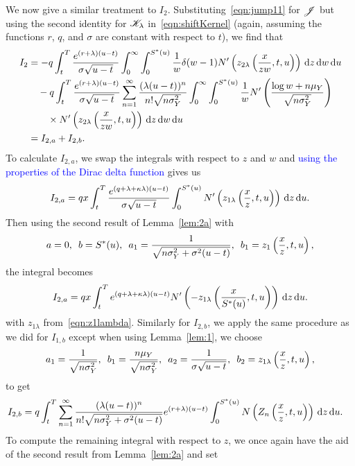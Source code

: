 		We now give a similar treatment to $I_2$. Substituting~\eqref{eqn:jump11} for $\mathscr J$ but using the second identity for $\mathscr K_\lambda$ in~\eqref{eqn:shiftKernel} (again, assuming the functions $r$, $q$, and $\sigma$ are constant with respect to $t$), we find that
		\begin{align*}
        			I_2 &= -q\int_t^T \frac{e^{(r+\lambda)(u-t)}}{\sigma\sqrt{u-t}} \int_0^\infty\int_0^{S^*(u)} \frac{1}{w} \delta(w-1) N'\left( z_{2\lambda}\left( \frac{x}{zw}, t, u \right) \right) \, \mathrm d z \, \mathrm d w \, \mathrm d u \\
        			& {}\quad -q\int_t^T \frac{e^{(r+\lambda)(u-t)}}{\sigma\sqrt{u-t}} \displaystyle\sum\limits_{n=1}^{\infty} \frac{(\lambda(u-t))^n}{n!\sqrt{n\sigma_Y^2}}\int_0^\infty \int_0^{S^*(u)} \frac{1}{w}N'\left( \frac{\log w + n\mu_Y}{\sqrt{n\sigma_Y^2}} \right) \\
        			& {} \quad \quad \times N'\left( z_{2\lambda}\left( \frac{x}{zw}, t, u \right) \right) \, \mathrm d z \, \mathrm d w \, \mathrm d u \\
        			&= I_{2,a} + I_{2,b}.
        		\end{align*}
		To calculate $I_{2,a}$, we swap the integrals with respect to $z$ and $w$ and \textcolor{blue}{using the properties of the Dirac delta function} gives us
			$$
				I_{2,a} = qx\int_t^T \frac{e^{(q+\lambda+\kappa\lambda)(u-t)}}{\sigma\sqrt{u-t}}\int_0^{S^*(u)} N'\left( z_{1\lambda}\left( \frac{x}{z}, t, u \right) \right) \, \mathrm d z \, \mathrm d u.
			$$
		Then using the second result of Lemma~\ref{lem:2a} with
			$$
				a = 0, \enskip b = S^*(u), \enskip a_1 = \frac{1}{\sqrt{n\sigma_Y^2 + \sigma^2(u-t)}}, \enskip
			b_1 = z_1\left( \frac{x}{z}, t, u \right),
			$$
		the integral becomes
			$$
				I_{2,a} = qx\int_t^T e^{(q+\lambda+\kappa\lambda)(u-t)} N'\left(-z_{1\lambda}\left( \frac{x}{S^*(u)}, t, u \right) \right) \, \mathrm d z \, \mathrm d u.
			$$
		with $z_{1\lambda}$ from~\eqref{eqn:z1lambda}. Similarly for $I_{2,b}$, we apply the same procedure as we did for $I_{1,b}$ except when using Lemma~\ref{lem:1}, we choose
			$$
        			a_1 = \frac{1}{\sqrt{n\sigma_Y^2}}, \enskip b_1 = \frac{n\mu_Y}{\sqrt{n\sigma_Y^2}}, \enskip
        			a_2 = \frac{1}{\sigma\sqrt{u-t}}, \enskip b_2 = z_{1\lambda}\left( \frac{x}{z}, t, u\right),
        		$$
	to get
			\begin{align*}
				I_{2,b} &= q  \int_t^T  \displaystyle\sum\limits_{n=1}^{\infty} \frac{(\lambda(u-t))^n}{n!\sqrt{n\sigma_Y^2 + \sigma^2(u-t)}}  e^{(r+\lambda)(u-t)} \int_0^{S^*(u)} N\left( Z_n \left( \frac{x}{z},t,u  \right) \right) \,\mathrm d z \, \mathrm d u.
			\end{align*}
	To compute the remaining integral with respect to $z$, we once again have the aid of the second result from Lemma~\ref{lem:2a} and set

